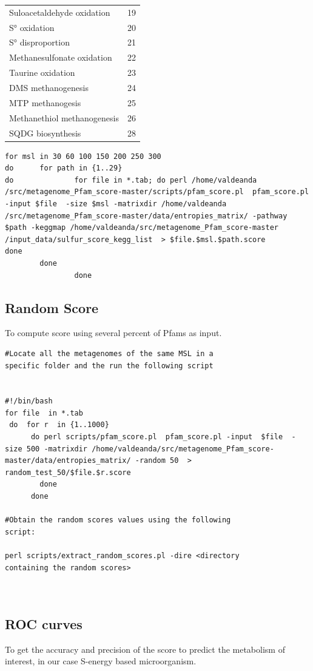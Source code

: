 \documentclass[12pt]{report}
\begin{document}
\begin{table}[H]
\begin{tabular}{@{}lc@{}}
Suloacetaldehyde oxidation  & 19     \\
S° oxidation                & 20     \\
S° disproportion            & 21     \\
Methanesulfonate oxidation  & 22     \\
Taurine oxidation           & 23     \\
DMS methanogenesis          & 24     \\
MTP methanogesis            & 25     \\
Methanethiol methanogenesis & 26     \\
SQDG biosynthesis           & 28     \\ \bottomrule
\end{tabular}
\end{table}

\begin{verbatim}
for msl in 30 60 100 150 200 250 300   
do      for path in {1..29}
do              for file in *.tab; do perl /home/valdeanda
/src/metagenome_Pfam_score-master/scripts/pfam_score.pl  pfam_score.pl 
-input $file  -size $msl -matrixdir /home/valdeanda
/src/metagenome_Pfam_score-master/data/entropies_matrix/ -pathway 
$path -keggmap /home/valdeanda/src/metagenome_Pfam_score-master
/input_data/sulfur_score_kegg_list  > $file.$msl.$path.score 
done
        done
                done
\end{verbatim}
\subsection{Random Score}

To compute score  using several percent of Pfams as input. 

\begin{verbatim}
#Locate all the metagenomes of the same MSL in a 
specific folder and the run the following script  


#!/bin/bash
for file  in *.tab
 do  for r  in {1..1000}
      do perl scripts/pfam_score.pl  pfam_score.pl -input  $file  -size 500 -matrixdir /home/valdeanda/src/metagenome_Pfam_score-master/data/entropies_matrix/ -random 50  > random_test_50/$file.$r.score
        done
      done

#Obtain the random scores values using the following 
script: 

perl scripts/extract_random_scores.pl -dire <directory 
containing the random scores>
     


\end{verbatim}


\subsection{ROC curves}
To get the accuracy and precision of the score to predict the metabolism of interest, in our case S-energy based microorganism.
\end{document}
